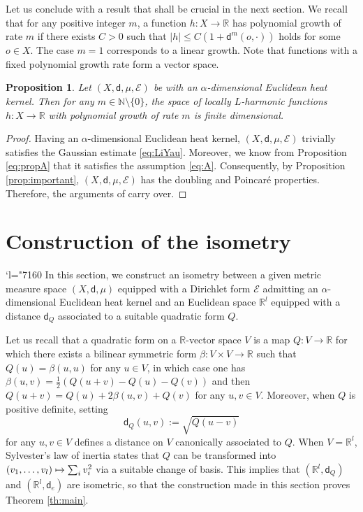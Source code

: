 \documentclass[10pt]{amsart}
\newcommand\mto{\mathchoice{\longmapsto}{\mapsto}{\mapsto}{\mapsto}}
\let\backslash\setminus
\newcommand{\Changel}{\mathcode`l="7160}
\theoremstyle{plain}
\newtheorem{proposition}[theorem]{Proposition}
\theoremstyle{definition}
\newcommand{\setN}{\mathbb{N}}
\newcommand{\setR}{\mathbb{R}}
\newcommand{\cE}{\mathcal{E}}
\newcommand{\dist}{\mathsf{d}}
\begin{document}
Let us conclude with a result that shall be crucial in the next section. We recall that for any positive integer $m$, a function $h:X \to \setR$ has polynomial growth of rate $m$ if there exists $C>0$ such that $|h|\le C(1+\dist^m(o,\cdot))$ holds for some $o \in X$. The case $m=1$ corresponds to a linear growth. Note that functions with a fixed polynomial growth rate form a vector space.

\begin{proposition}\label{prop:finitedim}
Let $(X,\dist,\mu,\cE)$ be with an $\alpha$-dimensional Euclidean heat kernel. Then for any $m \in \setN\backslash \{0\}$, the space of locally $L$-harmonic functions $h:X\to\setR$ with polynomial growth of rate $m$ is finite dimensional.
\end{proposition}

\begin{proof}
Having an $\alpha$-dimensional Euclidean heat kernel, $(X,\dist,\mu,\cE)$ trivially satisfies the Gaussian estimate \eqref{eq:LiYau}. Moreover, we know from Proposition \ref{eq:propA} that it satisfies the assumption \eqref{eq:A}. Consequently, by Proposition \ref{prop:important}, $(X,\dist,\mu,\cE)$ has the doubling and Poincaré properties. Therefore, the arguments of \cite{ColdingMinicozzi} carry over.
\end{proof}

\section{Construction of the isometry}\label{sec:4}
\Changel
In this section, we construct an isometry between a given metric measure space $(X,\dist,\mu)$ equipped with a Dirichlet form $\cE$ admitting an $\alpha$-dimensional Euclidean heat kernel and an Euclidean space $\setR^l$ equipped with a distance $\dist_Q$ associated to a suitable quadratic form $Q$.

Let us recall that a quadratic form on a $\setR$-vector space $V$ is a map $Q: V \to \setR$ for which there exists a bilinear symmetric form $\beta: V \times V \to\setR$ such that $Q(u)=\beta(u,u)$ for any $u \in V$, in which case one has
$\beta(u,v)=\frac{1}{2}(Q(u+v)-Q(u)-Q(v))$ and then
$Q(u+v)=Q(u) +2\beta(u,v) + Q(v)$ for any $u,v \in V$. Moreover, when $Q$ is positive definite, setting\begin{equation}\label{eq:dist_Q}\dist_Q(u,v):=\sqrt{Q(u-v)}\end{equation} for any $u,v \in V$ defines a distance on $V$ canonically associated to $Q$. When $V=\setR^l$, Sylvester's law of inertia states that $Q$ can be transformed into $(v_1,\ldots,v_l) \mto \sum_i v_i^2$ via a suitable change of basis. This implies that $(\setR^l,\dist_Q)$ and $(\setR^l,\dist_e)$ are isometric, so that the construction made in this section proves Theorem \ref{th:main}.
\end{document}
